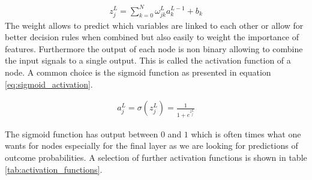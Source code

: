 \begin{align}
    z_j^L = \sum_{k=0}^{N} \omega_{jk}^L a_k^{L-1} + b_k
    \label{eq:node_input}
\end{align}
The weight allows to predict which variables are linked to each other or allow for better decision rules when combined but also easily to weight the importance of features. Furthermore the output of each node is non binary allowing to combine the input signals to a single output. This is called the activation function of a node. A common choice is the sigmoid function as presented in equation \eqref{eq:sigmoid_activation}.~\cite{chollet2015keras}

\begin{align}
    a_j^L = \sigma ( z_j^L ) = \frac{1}{1 + e^{z_j^L}}
    \label{eq:sigmoid_activation}
\end{align}

The sigmoid function has output between $0$ and $1$ which is often times what one wants for nodes especially for the final layer as we are looking for predictions of outcome probabilities. A selection of further activation functions is shown in table \ref{tab:activation_functions}.

